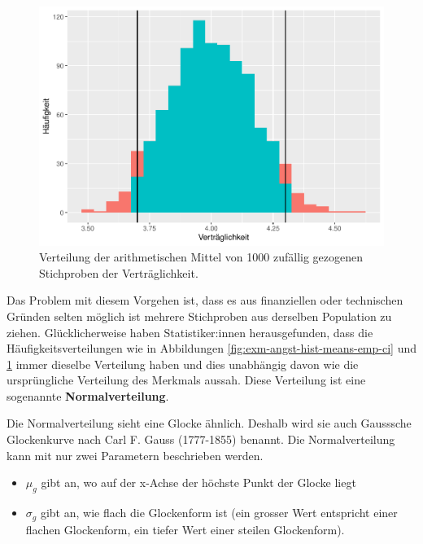 \documentclass[
]{book}
\providecommand{\tightlist}{%
  \setlength{\itemsep}{0pt}\setlength{\parskip}{0pt}}
\theoremstyle{definition}
\theoremstyle{definition}
\theoremstyle{definition}
\theoremstyle{definition}
\theoremstyle{remark}
\begin{document}
\begin{figure}

{\centering \includegraphics{aps_statistik1_files/figure-latex/exm-agreableness-hist-means-1} 

}

\caption{Verteilung der arithmetischen Mittel von 1000 zufällig gezogenen Stichproben der Verträglichkeit.}\label{fig:exm-agreableness-hist-means}
\end{figure}

Das Problem mit diesem Vorgehen ist, dass es aus finanziellen oder technischen Gründen selten möglich ist mehrere Stichproben aus derselben Population zu ziehen. Glücklicherweise haben Statistiker:innen herausgefunden, dass die Häufigkeitsverteilungen wie in Abbildungen \ref{fig:exm-angst-hist-means-emp-ci} und \ref{fig:exm-agreableness-hist-means} immer dieselbe Verteilung haben und dies unabhängig davon wie die ursprüngliche Verteilung des Merkmals aussah. \label{customdef-normalverteilung}{Diese Verteilung ist eine sogenannte \textbf{Normalverteilung}}.

Die Normalverteilung sieht eine Glocke ähnlich. Deshalb wird sie auch Gausssche Glockenkurve nach Carl F. Gauss (1777-1855) benannt. Die Normalverteilung kann mit nur zwei Parametern beschrieben werden.

\begin{itemize}
\tightlist
\item
  \(\mu_g\) gibt an, wo auf der x-Achse der höchste Punkt der Glocke liegt
\item
  \(\sigma_g\) gibt an, wie flach die Glockenform ist (ein grosser Wert entspricht einer flachen Glockenform, ein tiefer Wert einer steilen Glockenform).
\end{itemize}
\end{document}
